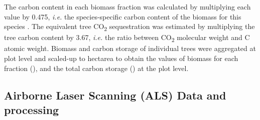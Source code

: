 The carbon content in each biomass fraction was calculated by multiplying each value by 0.475, \emph{i.e.} the species-specific carbon content of the biomass for this species  \autocite{Ibanezetal2002MetodologiaComplementaria,Monteroetal2005ProduccionBiomasa}. The equivalent tree CO\textsubscript{2} sequestration was estimated by multiplying the tree carbon content by 3.67, \emph{i.e.} the ratio between CO\textsubscript{2} molecular weight and C atomic weight. Biomass and carbon storage of individual trees were aggregated at plot level and  scaled-up to hectarea to obtain the values of biomass for each fraction (\mgha), and the total carbon storage (\mgha) at the plot level.


\begin{table}[]
\caption{Allometric equations to compute biomass fraction of \Qp \autocite{RuizPeinadoetal2012BiomassModels}. DBH: Diameter at breast height; h: Tree height.}
\label{tab:carbon:biomasseq}
\end{table}

\subsection{Airborne Laser Scanning (ALS) Data and processing}\label{sec:carbon:mat-lidar}


